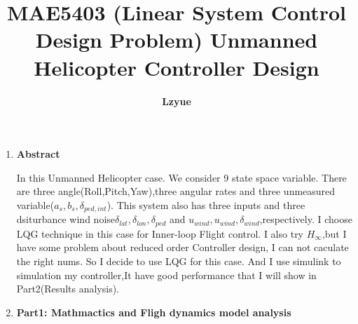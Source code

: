 \documentclass[12pt, a4paper]{article}
\title{MAE5403 (Linear System Control Design Problem) \textbf {Unmanned Helicopter Controller Design} }
\author{\textbf {Lzyue}}
\begin{document}
 
\maketitle
\begin{enumerate}[1.]\setlength{\itemsep}{1cm}

\item  \textbf{Abstract}


\hspace{0.5em}In this Unmanned Helicopter case. We consider 9 state space variable. There are three angle(Roll,Pitch,Yaw),three angular rates and three unmeasured
variable($a_s,b_s,\delta_{ped,int}$). This system also has three inputs and three dsiturbance wind noise$\delta_{lat},\delta_{lon},\delta_{ped}$ and $u_{wind},u_{wind},\delta_{wind}$,respectively.
I choose LQG technique in this case for Inner-loop Flight control. I also try $H_{\infty}$,but I have some problem about reduced order Controller design,
I can not caculate the right nums. So I decide to use LQG for this case. And I use simulink to simulation my controller,It have good performance that I will show in Part2(Results analysis).

\item  \textbf{ Part1: Mathmactics and Fligh dynamics model analysis}
\end{enumerate}
\end{document}
